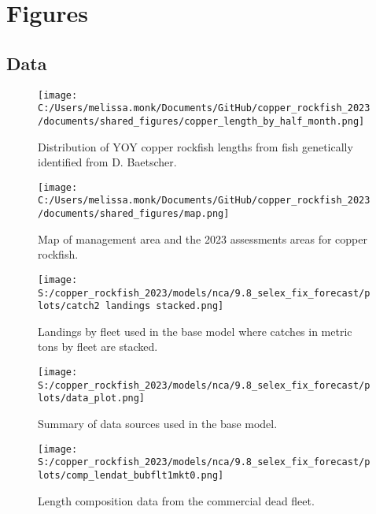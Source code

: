 \documentclass[11pt,
  english,
  letterpaper,
]{article}
\begin{document}
\newpage

\clearpage

\hypertarget{figures}{%
\section{Figures}\label{figures}}

\hypertarget{data-1}{%
\subsection{Data}\label{data-1}}

\begin{figure}
\centering
\texttt{[image: C:/Users/melissa.monk/Documents/GitHub/copper\_rockfish\_2023/documents/shared\_figures/copper\_length\_by\_half\_month.png]}
\caption{Distribution of YOY copper rockfish lengths from fish genetically identified from D. Baetscher.\label{fig:copper-smurf-length}}
\end{figure}

\pagebreak

\begin{figure}
\centering
\texttt{[image: C:/Users/melissa.monk/Documents/GitHub/copper\_rockfish\_2023/documents/shared\_figures/map.png]}
\caption{Map of management area and the 2023 assessments areas for copper rockfish.\label{fig:ca-map}}
\end{figure}

\pagebreak

\begin{figure}
\centering
\texttt{[image: S:/copper\_rockfish\_2023/models/nca/9.8\_selex\_fix\_forecast/plots/catch2 landings stacked.png]}
\caption{Landings by fleet used in the base model where catches in metric tons by fleet are stacked.\label{fig:catch}}
\end{figure}

\pagebreak

\begin{figure}
\centering
\texttt{[image: S:/copper\_rockfish\_2023/models/nca/9.8\_selex\_fix\_forecast/plots/data\_plot.png]}
\caption{Summary of data sources used in the base model.\label{fig:data-plot}}
\end{figure}

\pagebreak

\begin{figure}
\centering
\texttt{[image: S:/copper\_rockfish\_2023/models/nca/9.8\_selex\_fix\_forecast/plots/comp\_lendat\_bubflt1mkt0.png]}
\caption{Length composition data from the commercial dead fleet.\label{fig:com-dead-len-data}}
\end{figure}
\end{document}
